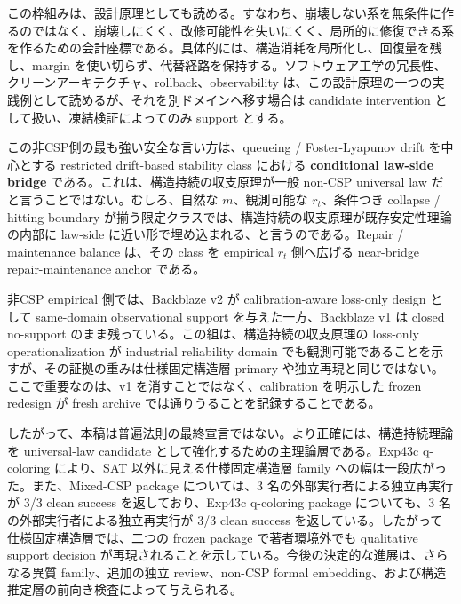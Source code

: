 \documentclass[12pt,a4paper]{article}
\begin{document}
この枠組みは、設計原理としても読める。すなわち、崩壊しない系を無条件に作るのではなく、崩壊しにくく、改修可能性を失いにくく、局所的に修復できる系を作るための会計座標である。具体的には、構造消耗を局所化し、回復量を残し、margin を使い切らず、代替経路を保持する。ソフトウェア工学の冗長性、クリーンアーキテクチャ、rollback、observability は、この設計原理の一つの実践例として読めるが、それを別ドメインへ移す場合は candidate intervention として扱い、凍結検証によってのみ support とする。

この非CSP側の最も強い安全な言い方は、queueing / Foster-Lyapunov drift を中心とする restricted drift-based stability class における \textbf{conditional law-side bridge} である。これは、構造持続の収支原理が一般 non-CSP universal law だと言うことではない。むしろ、自然な \(m\)、観測可能な \(r_{t}\)、条件つき collapse / hitting boundary が揃う限定クラスでは、構造持続の収支原理が既存安定性理論の内部に law-side に近い形で埋め込まれる、と言うのである。Repair / maintenance balance は、その class を empirical \(r_{t}\) 側へ広げる near-bridge repair-maintenance anchor である。

非CSP empirical 側では、Backblaze v2 が calibration-aware loss-only design として same-domain observational support を与えた一方、Backblaze v1 は closed no-support のまま残っている。この組は、構造持続の収支原理の loss-only operationalization が industrial reliability domain でも観測可能であることを示すが、その証拠の重みは仕様固定構造層 primary や独立再現と同じではない。ここで重要なのは、v1 を消すことではなく、calibration を明示した frozen redesign が fresh archive では通りうることを記録することである。

したがって、本稿は普遍法則の最終宣言ではない。より正確には、構造持続理論を universal-law candidate として強化するための主理論層である。Exp43c q-coloring により、SAT 以外に見える仕様固定構造層 family への幅は一段広がった。また、Mixed-CSP package については、3 名の外部実行者による独立再実行が 3/3 clean success を返しており、Exp43c q-coloring package についても、3 名の外部実行者による独立再実行が 3/3 clean success を返している。したがって仕様固定構造層では、二つの frozen package で著者環境外でも qualitative support decision が再現されることを示している。今後の決定的な進展は、さらなる異質 family、追加の独立 review、non-CSP formal embedding、および構造推定層の前向き検査によって与えられる。
\end{document}

